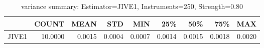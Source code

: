\begin{table}[ht]
\centering
\caption{variance summary: Estimator=JIVE1, Instruments=250, Strength=0.80}
\begin{tabular}{lrrrrrrrr}
\toprule
 & COUNT & MEAN & STD & MIN & 25\% & 50\% & 75\% & MAX \\
\midrule
JIVE1 & 10.0000 & 0.0015 & 0.0004 & 0.0007 & 0.0014 & 0.0015 & 0.0018 & 0.0020 \\
\bottomrule
\end{tabular}
\end{table}
